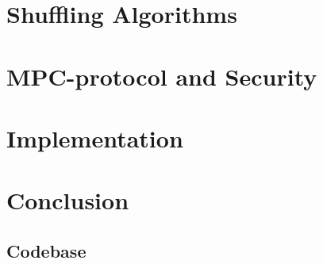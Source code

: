 \documentclass[twoside,11pt,openright]{report}
\begin{document}

\chapter{Shuffling Algorithms}
\label{ch:shuffle}



\chapter{MPC-protocol and Security}
\label{ch:mpc}



\chapter{Implementation}
\label{ch:implementation}



\chapter{Conclusion}
\label{ch:conclusion}



\begin{appendices}
\chapter{Codebase}

\label{appendix1}
\end{appendices}



%
%
\end{document}
